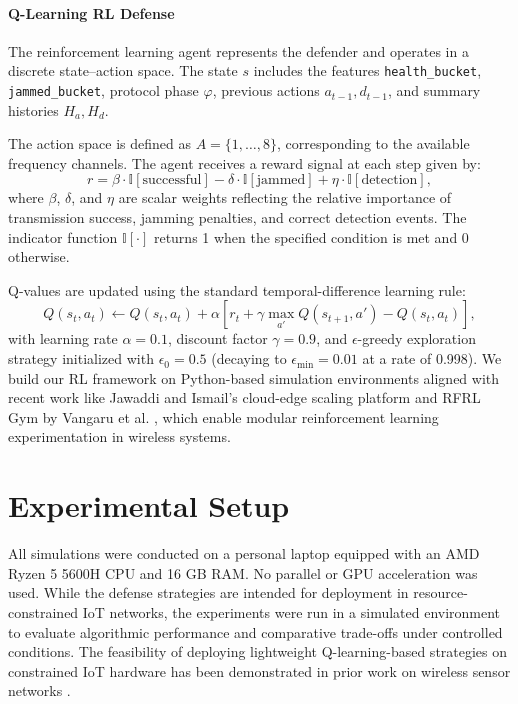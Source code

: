 \documentclass[conference]{IEEEtran}
\begin{document}
\paragraph{Q-Learning RL Defense}
The reinforcement learning agent represents the defender and operates in a discrete state–action space. The state $s$ includes the features \texttt{health\_bucket}, \texttt{jammed\_bucket}, protocol phase $\varphi$, previous actions $a_{t-1}, d_{t-1}$, and summary histories $H_a, H_d$.

The action space is defined as $A = \{1, \ldots, 8\}$, corresponding to the available frequency channels. The agent receives a reward signal at each step given by:
\[
r = \beta \cdot \mathbb{I}[\text{successful}] - \delta \cdot \mathbb{I}[\text{jammed}] + \eta \cdot \mathbb{I}[\text{detection}],
\]
where $\beta$, $\delta$, and $\eta$ are scalar weights reflecting the relative importance of transmission success, jamming penalties, and correct detection events. The indicator function $\mathbb{I}[\cdot]$ returns 1 when the specified condition is met and 0 otherwise.

Q-values are updated using the standard temporal-difference learning rule:
\[
Q(s_t, a_t) \leftarrow Q(s_t, a_t) + \alpha \left[ r_t + \gamma \max_{a'} Q(s_{t+1}, a') - Q(s_t, a_t) \right],
\]
with learning rate $\alpha = 0.1$, discount factor $\gamma = 0.9$, and $\epsilon$-greedy exploration strategy initialized with $\epsilon_0 = 0.5$ (decaying to $\epsilon_{\min} = 0.01$ at a rate of 0.998). We build our RL framework on Python-based simulation environments aligned with recent work like Jawaddi and Ismail's cloud-edge scaling platform \cite{jawaddi2024python} and RFRL Gym by Vangaru et al. \cite{vangaru2024rfrl}, which enable modular reinforcement learning experimentation in wireless systems.

\section{Experimental Setup}

All simulations were conducted on a personal laptop equipped with an AMD Ryzen 5 5600H CPU and 16 GB RAM. No parallel or GPU acceleration was used. While the defense strategies are intended for deployment in resource-constrained IoT networks, the experiments were run in a simulated environment to evaluate algorithmic performance and comparative trade-offs under controlled conditions. The feasibility of deploying lightweight Q-learning-based strategies on constrained IoT hardware has been demonstrated in prior work on wireless sensor networks \cite{savaglio2019lightweight}.
\end{document}
